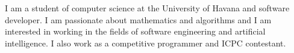 \documentclass[9pt]{developercv} %
\begin{document}
\vspace{0.5cm}





\begin{minipage}[t]{0.4\textwidth} %
	\vspace{-\baselineskip} %

	I am a student of computer science at the University of Havana and software developer. I am passionate
	about mathematics and algorithms and I am interested in working in the fields of software engineering and
	artificial intelligence. I also work as a competitive programmer and ICPC contestant.
\end{minipage}
\hfill %
\begin{minipage}[t]{0.5\textwidth} %
	\vspace{-\baselineskip} %
	\begin{barchart}{5.5}
	\end{barchart}
\end{minipage}

\begin{center}
\end{center}


\end{document}
